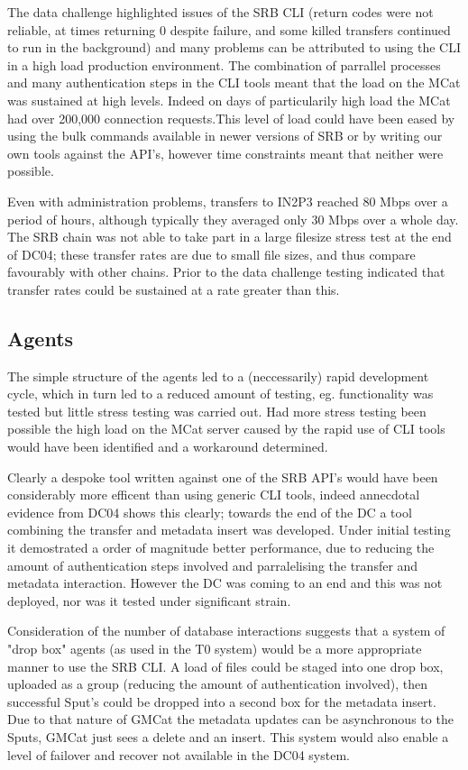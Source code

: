 \documentclass{cmspaper}
\begin{document}
The data challenge highlighted issues of the SRB CLI (return codes were not 
reliable, at times returning 0 despite failure, and some killed transfers continued to 
run in the background) and many problems can be attributed to using the CLI in
a high load production environment. The combination of parrallel processes and
many authentication steps in the CLI tools meant that the load on the MCat was 
sustained at high levels. Indeed on days of particularily high load the MCat
had over 200,000 connection requests.This level of load could have been 
eased by using the bulk commands available in newer versions of SRB or by 
writing our own tools against the API's, however time constraints meant that 
neither were possible.

Even with administration problems, transfers to IN2P3 reached 80 Mbps
over a period of hours, although typically they averaged only 30
Mbps over a whole day. The SRB chain was not able to take part in a
large filesize stress test at the end of DC04; these transfer rates
are due to small file sizes, and thus compare favourably with other
chains. Prior to the data challenge testing indicated that transfer
rates could be sustained at a rate greater than this.

\subsection{Agents}
The simple structure of the agents led to a (neccessarily) rapid development cycle, which 
in turn led to a reduced amount of testing, eg. functionality was tested but little stress 
testing was carried out. Had more stress testing been possible the high load on the MCat 
server caused by the rapid use of CLI tools would have been identified and a workaround 
determined. 

Clearly a despoke tool written against one of the SRB API's would have been considerably more 
efficent than using generic CLI tools, indeed annecdotal evidence from DC04 shows this clearly; 
towards the end of the DC a tool combining the transfer and metadata insert was developed. 
Under initial testing it demostrated a order of magnitude better performance, due to reducing 
the amount of authentication steps involved and parralelising the transfer and metadata 
interaction. However the DC was coming to an end and this was not deployed, nor was it tested 
under significant strain.

Consideration of the number of database interactions suggests that a system of "drop box" agents 
(as used in the T0 system) would be a more appropriate manner to use the SRB CLI. A load of 
files could be staged into one drop box, uploaded as a group (reducing the amount of 
authentication involved), then successful Sput's could be dropped into a second box for the 
metadata insert. Due to that nature of GMCat the metadata updates can be asynchronous to the 
Sputs, GMCat just sees a delete and an insert. This system would also enable a level of failover 
and recover not available in the DC04 system.
\end{document}
